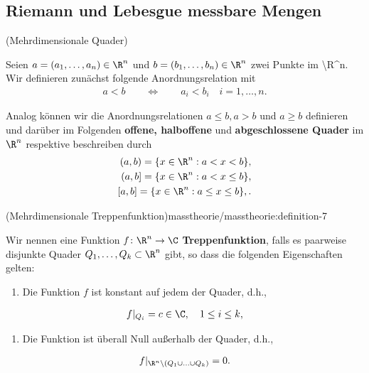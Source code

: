 \subsection{Riemann  und Lebesgue messbare Mengen}
\begin{definition}{(Mehrdimensionale Quader)}{}\label{masstheorie/masstheorie:definition-6}



\par
Seien \(a = (a_1,\ldots,a_n) \in \R^n\) und \(b = (b_1,\ldots,b_n) \in \R^n\) zwei Punkte im \textbackslash{}R\textasciicircum{}n.
Wir definieren zunächst folgende Anordnungsrelation mit
\begin{align*}
a < b \qquad \Leftrightarrow \qquad a_i < b_i \quad i=1,\ldots,n.
\end{align*}
\par
Analog können wir die Anordnungsrelationen \(a \leq b, a > b\) und \(a \geq b\) definieren und darüber im Folgenden \textbf{offene, halboffene} und \textbf{abgeschlossene Quader} im \(\R^n\) respektive beschreiben durch
\begin{align*}
(a,b) = \lbrace x \in \R^n : a < x < b \rbrace,\\
(a,b] = \lbrace x \in \R^n : a < x \leq b \rbrace,\\
[a,b] = \lbrace x \in \R^n : a \leq x \leq b \rbrace,.
\end{align*}\end{definition}
\begin{definition}{(Mehrdimensionale Treppenfunktion)}{masstheorie/masstheorie:definition-7}



\par
Wir nennen eine Funktion \(f \colon \R^n \rightarrow \C\) \textbf{Treppenfunktion}, falls es paarweise disjunkte Quader \(Q_1, \ldots, Q_k \subset \R^n\) gibt, so dass die folgenden Eigenschaften gelten:
\begin{enumerate}

\item {} 
\par
Die Funktion \(f\) ist konstant auf jedem der Quader, d.h.,

\end{enumerate}
\begin{align*}
f|_{Q_i} = c \in \C, \quad 1 \leq i \leq k,
\end{align*}\begin{enumerate}

\item {} 
\par
Die Funktion ist überall Null außerhalb der Quader, d.h.,

\end{enumerate}
\begin{align*}
f|_{\R^n \setminus (Q_1 \cup \ldots \cup Q_k)} = 0.
\end{align*}\end{definition}

